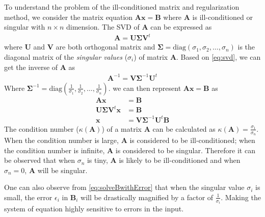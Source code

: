 			To understand the problem of the ill-conditioned matrix and regularization method, we consider the matrix equation $\boldsymbol{Ax}=\boldsymbol{B}$ where $\boldsymbol{A}$ is ill-conditioned or singular with $n\times n$ dimension.
			The \gls{SVD} of $\boldsymbol{A}$ can be expressed as 
			\begin{align}
				\boldsymbol{A} = \boldsymbol{U\Sigma V}^t
				\label{eq:svd}
			\end{align}
			where $\boldsymbol{U}$ and $\boldsymbol{V}$ are both orthogonal matrix and $\boldsymbol{\Sigma}=\mathrm{diag}(\sigma_1,\sigma_2,\dots,\sigma_n)$ is the diagonal matrix of the \emph{singular values} ($\sigma_i$) of matrix $\boldsymbol{A}$.
			Based on \cref{eq:svd}, we can get the inverse of $\boldsymbol{A}$ as 
			\begin{align}
				\boldsymbol{A}^{-1}= \boldsymbol{V\Sigma}^{-1}\boldsymbol{U}^t
				\label{eq:svdInverse}
			\end{align}
			Where $
			\boldsymbol{\Sigma}^{-1} = \mathrm{diag}(\frac{1}{\sigma_1},\frac{1}{\sigma_2},\dots,\frac{1}{\sigma_n})$.
			we can then represent $\boldsymbol{Ax}=\boldsymbol{B}$ as
			\begin{align}
				\boldsymbol{Ax}&=\boldsymbol{B} \nonumber\\
				\boldsymbol{U\Sigma V}^t\boldsymbol{x}&=\boldsymbol{B} \nonumber\\
				\boldsymbol{x}&=\boldsymbol{V\Sigma}^{-1}\boldsymbol{U}^t\boldsymbol{B}
				\label{eq:solveBwithError}
			\end{align}
			The condition number ($\kappa(\boldsymbol{A})$) of a matrix $\boldsymbol{A}$ can be calculated as $\kappa(\boldsymbol{A})=\frac{\sigma_1}{\sigma_n}$.
			When the condition number is large, $\boldsymbol{A}$ is considered to be ill-conditioned;
			when the condition number is infinite, $\boldsymbol{A}$ is considered to be singular.
			Therefore it can be observed that when $\sigma_n$ is tiny, $\boldsymbol{A}$ is likely to be ill-conditioned and when $\sigma_n=0$, $\boldsymbol{A}$ will be singular. 
			
			One can also observe from \cref{eq:solveBwithError} that when the singular value $\sigma_i$ is small, the error $\epsilon_i$ in $\boldsymbol{B}_i$ will be drastically magnified by a factor of $\frac{1}{\sigma_i}$. 
			Making the system of equation highly sensitive to errors in the input.
			
